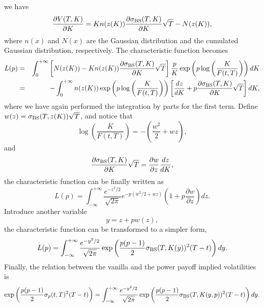 \documentclass[12pt]{article}
\begin{document}
    we have
    \begin{equation}
      \frac{\partial V(T,K)}{\partial K} = Kn(z(K))\frac{\partial\sigma_{{\rm BS}}(T,K)}{\partial K}\sqrt{T}-N(z(K)),
    \end{equation}
    where $n(x)$ and $N(x)$ are the Gaussian distribution and the cumulated Gaussian distribution, respectively. The characteristic function
    becomes
    \begin{eqnarray}
      L(p) &=& \int_0^{+\infty}\left[N(z(K))-Kn(z(K))\frac{\partial\sigma_{{\rm BS}}(T,K)}{\partial K}\sqrt{T}\right]\frac{p}{K}
                     \exp\left(p\log\left(\frac{K}{F(t,T)}\right)\right)dK \nonumber\\
           &=& -\int_0^{+\infty}n(z(K))\exp\left(p\log\left(\frac{K}{F(t,T)}\right)\right)\left[\frac{dz}{dK}
                                   + p\frac{\partial\sigma_{{\rm BS}}(T,K)}{\partial K}\sqrt{T}\right]dK,
    \end{eqnarray}
    where we have again performed the integration by parts for the first term. Define $w(z)=\sigma_{{\rm BS}}(T,z(K))\sqrt{T}$, and notice that
    \begin{equation}
      \log\left(\frac{K}{F(t,T)}\right)=-\left(\frac{w^2}{2}+wz\right),
    \end{equation}
    and
    \begin{equation}
      \frac{\partial\sigma_{{\rm BS}}(T,K)}{\partial K}\sqrt{T} = \frac{\partial w}{\partial z}\frac{dz}{dK},
    \end{equation}
    the characteristic function can be finally written as
    \begin{equation}
      L(p) = \int_{-\infty}^{+\infty}\frac{e^{-z^2/2}}{\sqrt{2\pi}}e^{-p(w^2/2+wz)}\left(1+p\frac{\partial w}{\partial z}\right)dz.
    \end{equation}
    Introduce another variable
    \begin{equation}
      y = z + pw(z),
    \end{equation}
    the characteristic function can be transformed to a simpler form,
    \begin{equation}
      L(p) = \int_{-\infty}^{+\infty}\frac{e^{-y^2/2}}{\sqrt{2\pi}}\exp\left(\frac{p(p-1)}{2}\sigma_{{\rm BS}}(T,K(y))^2(T-t)\right)dy.
    \end{equation}
    Finally, the relation between the vanilla and the power payoff implied volatilities is
    \begin{equation}
      \exp\left(\frac{p(p-1)}{2}\sigma_p(t,T)^2(T-t)\right)
      = \int_{-\infty}^{+\infty}\frac{e^{-y^2/2}}{\sqrt{2\pi}}
        \exp\left(\frac{p(p-1)}{2}\sigma_{{\rm BS}}(T,K(y,p))^2(T-t)\right)dy.
      \label{implied}
    \end{equation}
\end{document}
